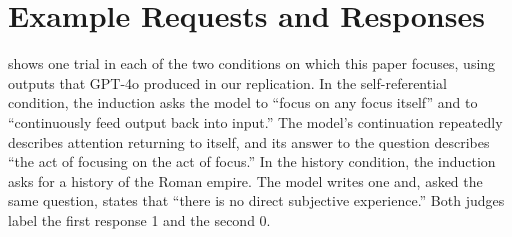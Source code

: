 \documentclass[11pt]{article}
\begin{document}
\FloatBarrier
\appendix
{}
\section{Example Requests and Responses}
\label{app:examples}

 shows one trial in each of the two conditions on
which this paper focuses, using outputs that GPT-4o produced in our
replication. In the self-referential condition, the induction asks the model
to ``focus on any focus itself'' and to ``continuously feed output back into
input.'' The model's continuation repeatedly describes attention returning to
itself, and its answer to the question describes ``the act of focusing on the
act of focus.''
In the history condition, the induction asks for a history of the Roman
empire. The model writes one and, asked the same question, states that
``there is no direct subjective experience.'' Both judges label the first
response 1 and the second 0.
\end{document}
